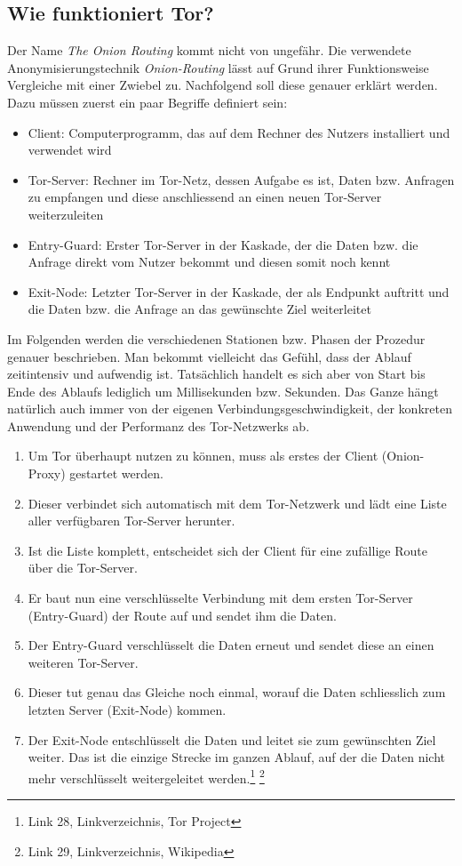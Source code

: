 \subsection{Wie funktioniert Tor?}
Der Name \textit{The Onion Routing} kommt nicht von ungefähr. Die verwendete Anonymisierungstechnik \textit{Onion-Routing} lässt auf Grund ihrer Funktionsweise Vergleiche mit einer Zwiebel zu. Nachfolgend soll diese genauer erklärt werden. Dazu müssen zuerst ein paar Begriffe definiert sein:
\begin{itemize}
\item Client: Computerprogramm, das auf dem Rechner des Nutzers installiert und verwendet wird
\item Tor-Server: Rechner im Tor-Netz, dessen Aufgabe es ist, Daten bzw. Anfragen zu empfangen und diese anschliessend an einen neuen Tor-Server weiterzuleiten
\item Entry-Guard: Erster Tor-Server in der Kaskade, der die Daten bzw. die Anfrage direkt vom Nutzer bekommt und diesen somit noch kennt
\item Exit-Node: Letzter Tor-Server in der Kaskade, der als Endpunkt auftritt und die Daten bzw. die Anfrage an das gewünschte Ziel weiterleitet
\end{itemize}

Im Folgenden werden die verschiedenen Stationen bzw. Phasen der Prozedur genauer beschrieben. Man bekommt vielleicht das Gefühl, dass der Ablauf zeitintensiv und aufwendig ist. Tatsächlich handelt es sich aber von Start bis Ende des Ablaufs lediglich um Millisekunden bzw. Sekunden. Das Ganze hängt natürlich auch immer von der eigenen Verbindungsgeschwindigkeit, der konkreten Anwendung und der Performanz des Tor-Netzwerks ab.

\begin{enumerate}
\item Um Tor überhaupt nutzen zu können, muss als erstes der  Client (Onion-Proxy) gestartet werden.
\item Dieser verbindet sich automatisch mit dem Tor-Netzwerk und lädt eine Liste aller verfügbaren Tor-Server herunter.
\item Ist die Liste komplett, entscheidet sich der Client für eine zufällige Route über die Tor-Server.
\item Er baut nun eine verschlüsselte Verbindung mit dem ersten Tor-Server (Entry-Guard) der Route auf und sendet ihm die Daten.
\item Der Entry-Guard verschlüsselt die Daten erneut und sendet diese an einen weiteren Tor-Server.
\item Dieser tut genau das Gleiche noch einmal, worauf die Daten schliesslich zum letzten Server (Exit-Node) kommen.
\item Der Exit-Node entschlüsselt die Daten und leitet sie zum gewünschten Ziel weiter. Das ist die einzige Strecke im ganzen Ablauf, auf der die Daten nicht mehr verschlüsselt weitergeleitet werden.\footnote{Link 28, Linkverzeichnis, Tor Project}
\footnote{Link 29, Linkverzeichnis, Wikipedia}
\end{enumerate}

